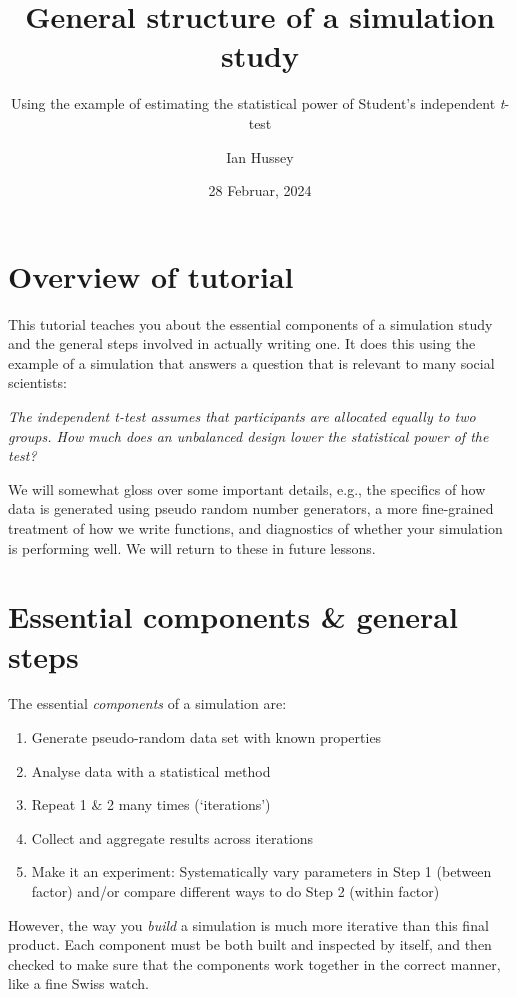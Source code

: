 \documentclass[
]{article}
\title{General structure of a simulation study}
\subtitle{Using the example of estimating the statistical power of
Student's independent \emph{t}-test}
\author{Ian Hussey}
\date{28 Februar, 2024}
\providecommand{\tightlist}{%
  \setlength{\itemsep}{0pt}\setlength{\parskip}{0pt}}
\begin{document}
\maketitle

{
\setcounter{tocdepth}{2}
\tableofcontents
}
\hypertarget{overview-of-tutorial}{%
\section{Overview of tutorial}\label{overview-of-tutorial}}

This tutorial teaches you about the essential components of a simulation
study and the general steps involved in actually writing one. It does
this using the example of a simulation that answers a question that is
relevant to many social scientists:

\emph{The independent t-test assumes that participants are allocated
equally to two groups. How much does an unbalanced design lower the
statistical power of the test?}

We will somewhat gloss over some important details, e.g., the specifics
of how data is generated using pseudo random number generators, a more
fine-grained treatment of how we write functions, and diagnostics of
whether your simulation is performing well. We will return to these in
future lessons.

\hypertarget{essential-components-general-steps}{%
\section{Essential components \& general
steps}\label{essential-components-general-steps}}

The essential \emph{components} of a simulation are:

\begin{enumerate}
\def\labelenumi{\arabic{enumi}.}
\tightlist
\item
  Generate pseudo-random data set with known properties
\item
  Analyse data with a statistical method
\item
  Repeat 1 \& 2 many times (`iterations')
\item
  Collect and aggregate results across iterations
\item
  Make it an experiment: Systematically vary parameters in Step 1
  (between factor) and/or compare different ways to do Step 2 (within
  factor)
\end{enumerate}

However, the way you \emph{build} a simulation is much more iterative
than this final product. Each component must be both built and inspected
by itself, and then checked to make sure that the components work
together in the correct manner, like a fine Swiss watch.
\end{document}
